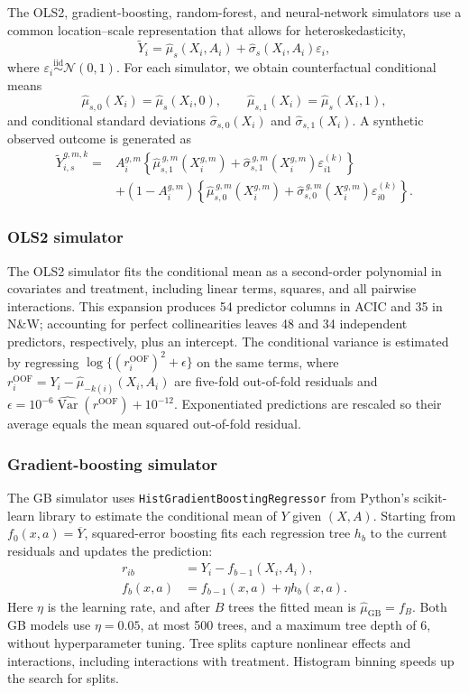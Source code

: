 The OLS2, gradient-boosting, random-forest, and neural-network simulators use a common location--scale representation that allows for heteroskedasticity,
\[
\widetilde Y_i
=
\widehat{\mu}_s(X_i,A_i)
+
\widehat{\sigma}_s(X_i,A_i)\varepsilon_i,
\]
where \(\varepsilon_i\overset{\mathrm{iid}}{\sim}\mathcal N(0,1)\). For each simulator, we obtain counterfactual conditional means
\[
\widehat{\mu}_{s,0}(X_i)
=
\widehat{\mu}_s(X_i,0),
\qquad
\widehat{\mu}_{s,1}(X_i)
=
\widehat{\mu}_s(X_i,1),
\]
and conditional standard deviations \(\widehat{\sigma}_{s,0}(X_i)\) and \(\widehat{\sigma}_{s,1}(X_i)\). A synthetic observed outcome is generated as
\[
\begin{aligned}
\widetilde Y_{i,s}^{g,m,k}
={}&
A_i^{g,m}
\left\{
\widehat{\mu}_{s,1}^{\,g,m}(X_i^{g,m})
+
\widehat{\sigma}_{s,1}^{\,g,m}(X_i^{g,m})\varepsilon_{i1}^{(k)}
\right\}\\
&+
\left(1-A_i^{g,m}\right)
\left\{
\widehat{\mu}_{s,0}^{\,g,m}(X_i^{g,m})
+
\widehat{\sigma}_{s,0}^{\,g,m}(X_i^{g,m})\varepsilon_{i0}^{(k)}
\right\}.
\end{aligned}
\]

\subsubsection{OLS2 simulator}

The OLS2 simulator fits the conditional mean as a second-order polynomial in covariates and treatment, including linear terms, squares, and all pairwise interactions. This expansion produces 54 predictor columns in ACIC and 35 in N\&W; accounting for perfect collinearities leaves 48 and 34 independent predictors, respectively, plus an intercept. The conditional variance is estimated by regressing \(\log\{(r_i^{\mathrm{OOF}})^2+\epsilon\}\) on the same terms, where \(r_i^{\mathrm{OOF}}=Y_i-\widehat\mu_{-k(i)}(X_i,A_i)\) are five-fold out-of-fold residuals and \(\epsilon=10^{-6}\widehat{\operatorname{Var}}(r^{\mathrm{OOF}})+10^{-12}\). Exponentiated predictions are rescaled so their average equals the mean squared out-of-fold residual.

\subsubsection{Gradient-boosting simulator}

The GB simulator uses \texttt{HistGradientBoostingRegressor} from Python's scikit-learn library to estimate the conditional mean of \(Y\) given \((X,A)\). Starting from \(f_0(x,a)=\overline Y\), squared-error boosting fits each regression tree \(h_b\) to the current residuals and updates the prediction:
\[
\begin{aligned}
r_{ib} &= Y_i-f_{b-1}(X_i,A_i),\\
f_b(x,a) &= f_{b-1}(x,a)+\eta h_b(x,a).
\end{aligned}
\]
Here \(\eta\) is the learning rate, and after \(B\) trees the fitted mean is \(\widehat\mu_{\mathrm{GB}}=f_B\). Both GB models use \(\eta=0.05\), at most 500 trees, and a maximum tree depth of 6, without hyperparameter tuning. Tree splits capture nonlinear effects and interactions, including interactions with treatment. Histogram binning speeds up the search for splits.

